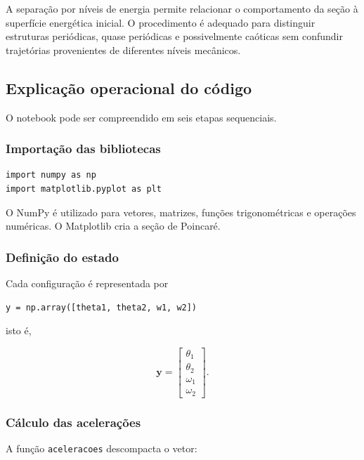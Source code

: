 \documentclass[12pt,a4paper]{article}
\begin{document}
A separação por níveis de energia permite relacionar o comportamento da seção à superfície energética inicial. O procedimento é adequado para distinguir estruturas periódicas, quase periódicas e possivelmente caóticas sem confundir trajetórias provenientes de diferentes níveis mecânicos.

\subsection{Explicação operacional do código}

O notebook pode ser compreendido em seis etapas sequenciais.

\subsubsection{Importação das bibliotecas}

\begin{lstlisting}
import numpy as np
import matplotlib.pyplot as plt
\end{lstlisting}

O NumPy é utilizado para vetores, matrizes, funções trigonométricas e operações numéricas. O Matplotlib cria a seção de Poincaré.

\subsubsection{Definição do estado}

Cada configuração é representada por

\begin{lstlisting}
y = np.array([theta1, theta2, w1, w2])
\end{lstlisting}

isto é,

\begin{equation}
\mathbf y=
\begin{bmatrix}
\theta_1\\\theta_2\\\omega_1\\\omega_2
\end{bmatrix}.
\end{equation}

\subsubsection{Cálculo das acelerações}

A função \texttt{aceleracoes} descompacta o vetor:
\end{document}
